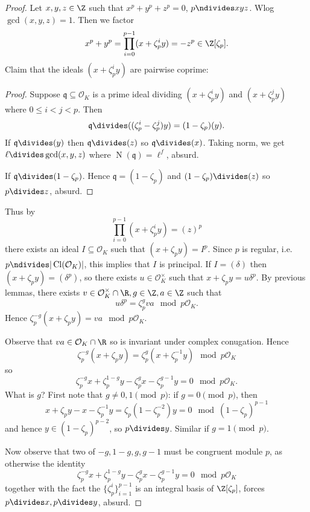 \documentclass[a4paper]{article}
\renewcommand*{\O}{\mathcal{O}}
\DeclareMathOperator{\n}{N}
\DeclareMathOperator{\Cl}{Cl} %
\begin{document}
\begin{proof}
  Let \(x, y, z \in \Z\) such that \(x^p + y^p + z^p = 0\), \(p \ndivides xyz\). Wlog \(\gcd(x, y, z) = 1\). Then we factor
  \[
    x^p + y^p = \prod_{i = 0}^{p - 1} (x + \zeta_p^i y) = -z^p \in \Z[\zeta_p].
  \]
  Claim that the ideals \((x + \zeta_p^i y)\) are pairwise coprime:
  \begin{proof}
    Suppose \(\mathfrak q \subseteq \O_K\) is a prime ideal dividing \((x + \zeta_p^i y)\) and \((x + \zeta_p^j y)\) where \(0 \leq i < j < p\). Then
    \[
      \mathfrak q \divides ((\zeta_p^i - \zeta_p^j) y) = (1 - \zeta_p)(y).
    \]
    If \(\mathfrak q \divides (y)\) then \(\mathfrak q \divides (z)\) so \(\mathfrak q \divides (x)\). Taking norm, we get \(\ell \divides \gcd(x, y, z)\) where \(\n(\mathfrak q) = \ell^f\), absurd.

    If \(\mathfrak q \divides (1 - \zeta_p) \). Hence \(\mathfrak q = (1 - \zeta_p)\) and \((1 - \zeta_p) \divides (z)\) so \(p \divides z\), absurd.
  \end{proof}

  Thus by
  \[
    \prod_{i = 0}^{p - 1} (x + \zeta_p^i y) = (z)^p
  \]
  there exists an ideal \(I \subseteq \O_K\) such that \((x + \zeta_p y) = I^p\). Since \(p\) is regular, i.e.\ \(p \ndivides |\Cl(\O_K)|\), this implies that \(I\) is principal. If \(I = (\delta)\) then \((x + \zeta_py) = (\delta^p)\), so there exists \(u \in \O_K^\times\) such that \(x + \zeta_p y = u \delta^p\). By previous lemmas, there exists \(v \in \O_K^\times \cap \R, g \in \Z, a \in \Z\) such that
  \[
    u \delta^p = \zeta_p^g va \mod{p\O_K}.
  \]
  Hence \(\zeta_p^{-g} (x + \zeta_p y) = va \mod{p\O_K}\).

  Observe that \(va \in \O_K \cap \R\) so is invariant under complex conugation. Hence
  \[
    \zeta_p^{-g} (x + \zeta_p y) = \zeta_p^g (x + \zeta_p^{-1} y) \mod{p\O_K}
  \]
  so
  \[
    \zeta_p^{-g} x + \zeta_p^{1 - g} y - \zeta_p^g x - \zeta_p^{g - 1} y = 0 \mod{p\O_K}.
  \]
  What is \(g\)? First note that \(g \neq 0, 1 \pmod p\): if \(g = 0 \pmod p\), then
  \[
    x + \zeta_p y - x - \zeta_p^{-1} y = \zeta_p(1 - \zeta_p^{-2}) y = 0 \mod (1 - \zeta_p)^{p - 1}
  \]
  and hence \(y \in (1 - \zeta_p)^{p - 2}\), so \(p \divides y\). Similar if \(g = 1 \pmod p\).

  Now observe that two of \(-g, 1 - g, g, g - 1\) must be congruent module \(p\), as otherwise the identity
  \[
    \zeta_p^{-g} x + \zeta_p^{1 - g} y - \zeta_p^g x - \zeta_p^{g - 1} y = 0 \mod{p\O_K}
  \]
  together with the fact the \(\{\zeta_p^i\}_{i = 1}^{p - 1}\) is an integral basis of \(\Z[\zeta_p]\), forces \(p \divides x, p \divides y\), absurd.


\end{proof}
\end{document}
